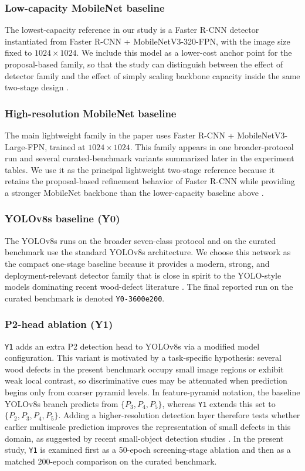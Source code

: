 \documentclass[10pt,a4paper]{article}
\begin{document}
\subsubsection{Low-capacity MobileNet baseline}
The lowest-capacity reference in our study is a Faster R-CNN detector instantiated from Faster R-CNN + MobileNetV3-320-FPN,  with the image size fixed to $1024 \times 1024$. We include this model as a lower-cost anchor point for the proposal-based family, so that the study can distinguish between the effect of detector family and the effect of simply scaling backbone capacity inside the same two-stage design \citep{faster_rcnn,mobilenetv3}.

\subsubsection{High-resolution MobileNet baseline}
The main lightweight family in the paper uses Faster R-CNN + MobileNetV3-Large-FPN, trained at $1024 \times 1024$. This family appears in one broader-protocol run and several curated-benchmark variants summarized later in the experiment tables. We use it as the principal lightweight two-stage reference because it retains the proposal-based refinement behavior of Faster R-CNN while providing a stronger MobileNet backbone than the lower-capacity baseline above \citep{faster_rcnn,mobilenetv3}.

\subsubsection{YOLOv8s baseline (Y0)}
The YOLOv8s runs on the broader seven-class protocol and on the curated benchmark use the standard YOLOv8s architecture. We choose this network as the compact one-stage baseline because it provides a modern, strong, and deployment-relevant detector family that is close in spirit to the YOLO-style models dominating recent wood-defect literature \citep{odca_yolo,bpn_yolo,sim_yolo,fdd_yolo}. The final reported run on the curated benchmark is denoted \texttt{Y0-3600e200}.

\subsubsection{P2-head ablation (Y1)}
\texttt{Y1} adds an extra P2 detection head to YOLOv8s via a modified model configuration. This variant is motivated by a task-specific hypothesis: several wood defects in the present benchmark occupy small image regions or exhibit weak local contrast, so discriminative cues may be attenuated when prediction begins only from coarser pyramid levels. In feature-pyramid notation, the baseline YOLOv8s branch predicts from $\{P_3, P_4, P_5\}$, whereas \texttt{Y1} extends this set to $\{P_2, P_3, P_4, P_5\}$. Adding a higher-resolution detection layer therefore tests whether earlier multiscale prediction improves the representation of small defects in this domain, as suggested by recent small-object detection studies \citep{wei_2024_smallreview,hua_2025_smallsurvey,cmc_insulator_small}. In the present study, \texttt{Y1} is examined first as a 50-epoch screening-stage ablation and then as a matched 200-epoch comparison on the curated benchmark.
\end{document}
